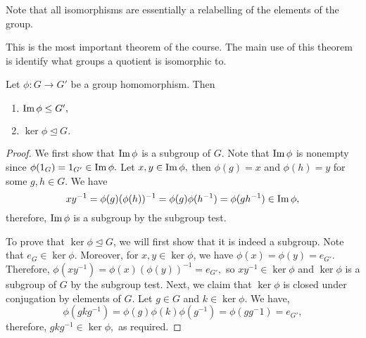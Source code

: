 \begin{remark}
Note that all isomorphisms are essentially a relabelling of the elements of the group.
\end{remark}

This is the most important theorem of the course. The main use of this theorem is identify what groups a quotient is isomorphic to.

\begin{theorem} 
  Let $\phi:G\to G'$ be a group homomorphism. Then 
  \begin{enumerate}
    \item $\operatorname{Im}\phi \leq G',$
    \item $\ker\phi \trianglelefteq G.$
  \end{enumerate}
  \label{firstIso1}
\end{theorem}
\begin{proof} 
  We first show that $\operatorname{Im} \phi$ is a subgroup of $G.$ Note that $\operatorname{Im} \phi$ is nonempty since $\phi(1_G)=1_{G'}\in \operatorname{Im} \phi.$ Let $x,y\in \operatorname{Im} \phi,$ then $\phi(g)=x$ and $\phi(h)=y$ for some $g,h\in G.$ We have 
  $$xy^{-1}=\phi(g)(\phi(h))^{-1}=\phi(g)\phi(h^{-1})=\phi(gh^{-1})\in \operatorname{Im} \phi,$$
  therefore, $\operatorname{Im}\phi$ is a subgroup by the subgroup test.

  To prove that $\ker\phi \trianglelefteq G$, we will first show that it is indeed a subgroup. Note that $e_G\in\ker\phi$. Moreover, for $x,y\in\ker\phi$, we have $\phi (x) = \phi (y) =e_{G'}.$ Therefore, $\phi (xy^{-1})=\phi(x)(\phi(y))^{-1}=e_{G'},$ so  $xy^{-1}\in \ker \phi$ and $\ker \phi$ is a subgroup of $G$ by the subgroup test. Next, we claim that $\ker \phi$ is closed under conjugation by elements of $G$. Let $ g\in G$ and $k \in \ker \phi.$
 We have,
 $$\phi(gkg^{-1})=\phi(g)\phi(k)\phi(g^{-1})=\phi(gg^-1)=e_{G'},$$
 therefore, $gkg^{-1} \in \ker \phi,$ as required.
\end{proof}

